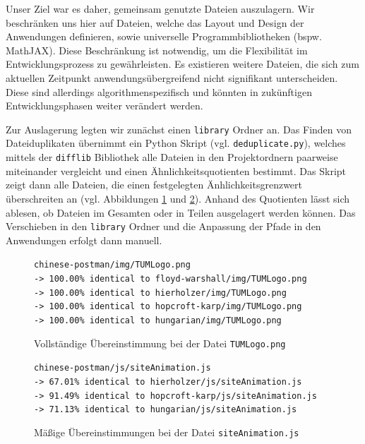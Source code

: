 Unser Ziel war es daher, gemeinsam genutzte Dateien auszulagern. Wir beschränken uns hier auf Dateien, welche das Layout und Design der Anwendungen definieren, sowie universelle Programmbibliotheken (bspw. MathJAX). Diese Beschränkung ist notwendig, um die Flexibilität im Entwicklungsprozess zu gewährleisten. Es existieren weitere Dateien, die sich zum aktuellen Zeitpunkt anwendungsübergreifend nicht signifikant unterscheiden. Diese sind allerdings algorithmenspezifisch und könnten in zukünftigen Entwicklungsphasen weiter verändert werden.

Zur Auslagerung legten wir zunächst einen \texttt{library} Ordner an. Das Finden von Dateiduplikaten übernimmt ein Python Skript (vgl. \texttt{deduplicate.py}), welches mittels der \texttt{difflib} Bibliothek alle Dateien in den Projektordnern paarweise miteinander vergleicht und einen Ähnlichkeitsquotienten bestimmt. Das Skript zeigt dann alle Dateien, die einen festgelegten Änhlichkeitsgrenzwert überschreiten an (vgl. Abbildungen \ref{fig:shared-files-1} und \ref{fig:shared-files-2}). Anhand des Quotienten lässt sich ablesen, ob Dateien im Gesamten oder in Teilen ausgelagert werden können. Das Verschieben in den \texttt{library} Ordner und die Anpassung der Pfade in den Anwendungen erfolgt dann manuell.

\begin{figure}[h!]
\noindent\texttt{chinese-postman/img/TUMLogo.png \\
-> 100.00\% identical to floyd-warshall/img/TUMLogo.png \\
-> 100.00\% identical to hierholzer/img/TUMLogo.png \\
-> 100.00\% identical to hopcroft-karp/img/TUMLogo.png \\
-> 100.00\% identical to hungarian/img/TUMLogo.png
}
\caption[Gemeinsame Dateien: Beispiel 1]{Vollständige Übereinstimmung bei der Datei \texttt{TUMLogo.png}}\label{fig:shared-files-1}
\end{figure}

\begin{figure}[h!]
\noindent\texttt{chinese-postman/js/siteAnimation.js \\
-> 67.01\% identical to hierholzer/js/siteAnimation.js \\
-> 91.49\% identical to hopcroft-karp/js/siteAnimation.js \\
-> 71.13\% identical to hungarian/js/siteAnimation.js
}
\caption[Gemeinsame Dateien: Beispiel 2]{Mäßige Übereinstimmungen bei der Datei \texttt{siteAnimation.js}}\label{fig:shared-files-2}
\end{figure}

